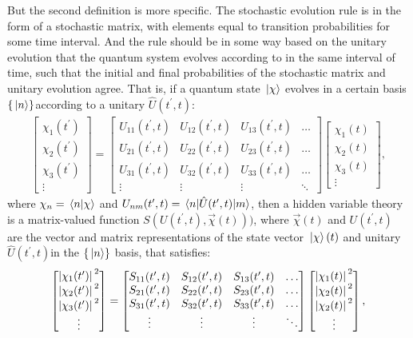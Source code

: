 But the second definition is more specific. The stochastic evolution rule is in the form of a stochastic matrix, with elements equal to transition probabilities for some time interval. And the rule should be in some way based on the unitary evolution that the quantum system evolves according to in the same interval of time, such that the initial and final probabilities of the stochastic matrix and unitary evolution agree. That is, if a quantum state $\ket\chi$ evolves in a certain basis $\{\ket{n}\}$according to a unitary $\hat U(t^\prime, t)$:
\begin{align}
\left[\begin{matrix}
\chi_1(t^\prime)\\\chi_2(t^\prime)\\\chi_3(t^\prime)\\\vdots
\end{matrix}\right]
= \left[\begin{matrix}
U_{11}(t^\prime, t) & U_{12}(t^\prime, t) & U_{13}(t^\prime, t)&\hdots\\
U_{21}(t^\prime, t) & U_{22}(t^\prime, t) & U_{23}(t^\prime, t)&\hdots\\
U_{31}(t^\prime, t) & U_{32}(t^\prime, t) & U_{33}(t^\prime, t)&\hdots\\
\vdots & \vdots & \vdots & \ddots
\end{matrix}\right]
\left[\begin{matrix}
\chi_1(t)\\\chi_2(t)\\\chi_3(t)\\\vdots
\end{matrix}\right],
\end{align}
where $\chi_n = \braket{n}{\chi}$ and $U_{nm}(t^\prime, t) = \matrixel{n}{\hat U(t^\prime, t)}{m}$, then a hidden variable theory is a matrix-valued function $S(U(t^\prime, t), \vec\chi(t)))$, where $\vec\chi(t)$ and $U(t^\prime, t)$ are the vector and matrix representations of the state vector $\ket\chi(t)$ and unitary $\hat U(t^\prime, t)$in the $\{\ket{n}\}$ basis, that satisfies:
\begin{align}
\left[\begin{matrix}
\abs{\chi_1(t^\prime)}^2\\\abs{\chi_2(t^\prime)}^2\\\abs{\chi_3(t^\prime)}^2\\\vdots
\end{matrix}\right]
= \left[\begin{matrix}
S_{11}(t^\prime, t) & S_{12}(t^\prime, t) & S_{13}(t^\prime, t)&\hdots\\
S_{21}(t^\prime, t) & S_{22}(t^\prime, t) & S_{23}(t^\prime, t)&\hdots\\
S_{31}(t^\prime, t) & S_{32}(t^\prime, t) & S_{33}(t^\prime, t)&\hdots\\
\vdots & \vdots & \vdots & \ddots
\end{matrix}\right]
\left[\begin{matrix}
\abs{\chi_1(t)}^2\\\abs{\chi_2(t)}^2\\\abs{\chi_2(t)}^2\\\vdots
\end{matrix}\right],
\end{align}
